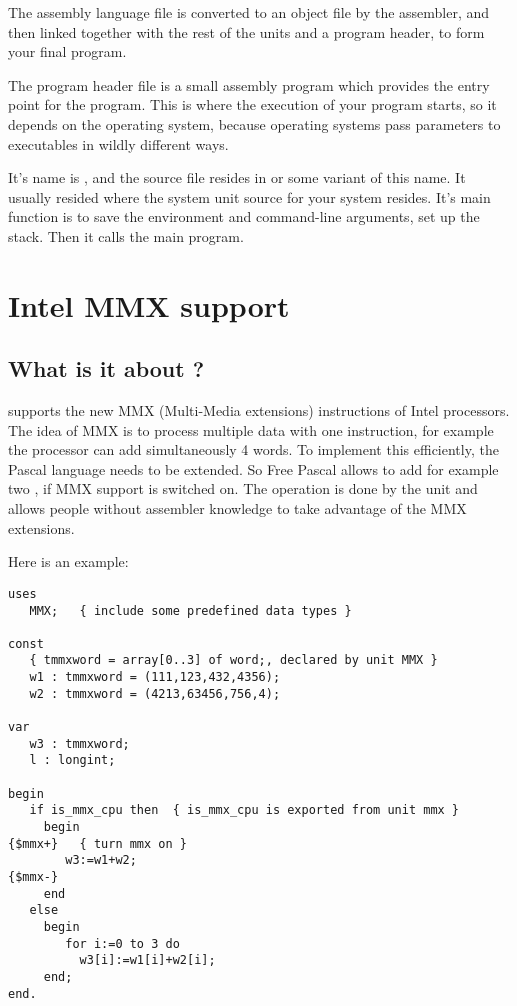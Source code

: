 \documentclass{report}
\begin{document}
The assembly language file is converted to an object file by the assembler,
and then linked together with the rest of the units and a program header, to
form your final program.

The program header file is a small assembly program which provides the entry
point for the program. This is where the execution of your program starts,
so it depends on the operating system, because operating systems pass
parameters to executables in wildly different ways.

It's name is , and the
source file resides in  or some variant of this name. It
usually resided where the system unit source for your system resides.
It's main function is to save the environment and command-line arguments,
set up the stack. Then it calls the main program.

\chapter{Intel MMX support}
\label{ch:MMXSupport}

\section{What is it about ?}
\label{se:WhatisMMXabout}
\fpc supports the new MMX (Multi-Media extensions)
instructions of Intel processors. The idea of MMX is to
process multiple data with one instruction, for example the processor
can add simultaneously 4 words. To implement this efficiently, the
Pascal language needs to be extended. So Free Pascal allows
to add for example two ,
if MMX support is switched on. The operation is done
by the  unit and allows people without assembler knowledge to take
advantage of the MMX extensions.

Here is an example:
\begin{verbatim}
uses
   MMX;   { include some predefined data types }

const
   { tmmxword = array[0..3] of word;, declared by unit MMX }
   w1 : tmmxword = (111,123,432,4356);
   w2 : tmmxword = (4213,63456,756,4);

var
   w3 : tmmxword;
   l : longint;

begin
   if is_mmx_cpu then  { is_mmx_cpu is exported from unit mmx }
     begin
{$mmx+}   { turn mmx on }
        w3:=w1+w2;
{$mmx-}
     end
   else
     begin
        for i:=0 to 3 do
          w3[i]:=w1[i]+w2[i];
     end;
end.
\end{verbatim}
\end{document}

